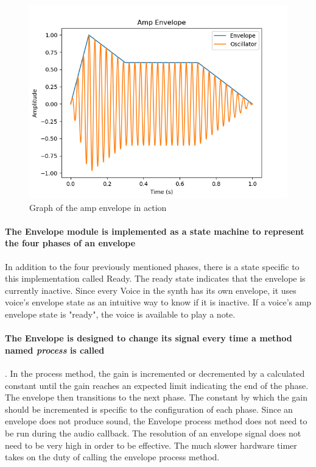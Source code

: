 \documentclass[acmlarge,screen]{acmart}
\begin{document}
	\begin{figure}
		\centering
		\includegraphics[width=.8\linewidth]{amp_envelope_visual}
		\caption{Graph of the amp envelope in action}
	\end{figure}
	
	\paragraph{The Envelope module is implemented as a state machine to represent the four phases of an envelope} In addition to the four previously mentioned phases, there is a state specific to this implementation called Ready. The ready state indicates that the envelope is currently inactive. Since every Voice in the synth has its own envelope, it uses voice's envelope state as an intuitive way to know if it is inactive. If a voice's amp envelope state is "ready", the voice is available to play a note. 
	
	\paragraph{The Envelope is designed to change its signal every time a method named \textit{process} is called}. In the process method, the gain is incremented or decremented by a calculated constant until the gain reaches an expected limit indicating the end of the phase. The envelope then transitions to the next phase. The constant by which the gain should be incremented is specific to the configuration of each phase. Since an envelope does not produce sound, the Envelope process method does not need to be run during the audio callback. The resolution of an envelope signal does not need to be very high in order to be effective. The much slower hardware timer takes on the duty of calling the envelope process method.
	
\end{document}
